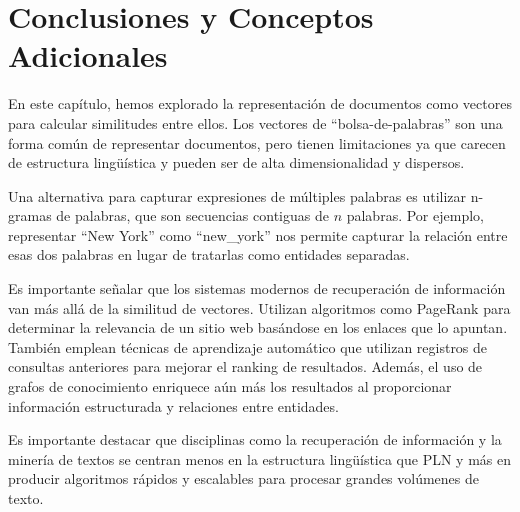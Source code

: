 \section{Conclusiones y Conceptos Adicionales}

En este capítulo, hemos explorado la representación de documentos como vectores para calcular similitudes entre ellos. Los vectores de ``bolsa-de-palabras'' son una forma común de representar documentos, pero tienen limitaciones ya que carecen de estructura lingüística y pueden ser de alta dimensionalidad y dispersos.

Una alternativa para capturar expresiones de múltiples palabras es utilizar n-gramas de palabras, que son secuencias contiguas de $n$ palabras. Por ejemplo, representar ``New York'' como ``new\_york'' nos permite capturar la relación entre esas dos palabras en lugar de tratarlas como entidades separadas.

Es importante señalar que los sistemas modernos de recuperación de información van más allá de la similitud de vectores. Utilizan algoritmos como PageRank \cite{page1998pagerank} para determinar la relevancia de un sitio web basándose en los enlaces que lo apuntan. También emplean técnicas de aprendizaje automático que utilizan registros de consultas anteriores para mejorar el ranking de resultados. Además, el uso de grafos de conocimiento enriquece aún más los resultados al proporcionar información estructurada y relaciones entre entidades.

Es importante destacar que disciplinas como la recuperación de información y la minería de textos se centran menos en la estructura lingüística que PLN y más en producir algoritmos rápidos y escalables para procesar grandes volúmenes de texto.
